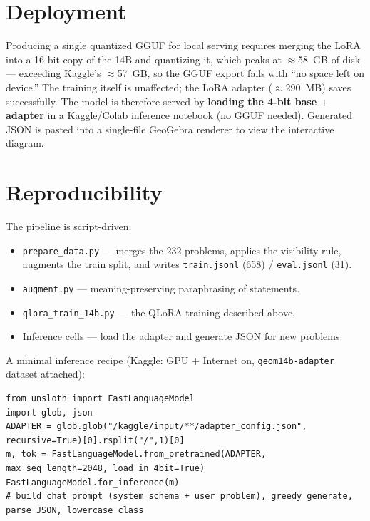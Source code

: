 \documentclass[11pt]{article}
\newcommand{\code}[1]{\texttt{#1}}
\begin{document}
\section{Deployment}
Producing a single quantized GGUF for local serving requires merging the LoRA into a 16-bit
copy of the 14B and quantizing it, which peaks at $\approx$58~GB of disk --- exceeding Kaggle's
$\approx$57~GB, so the GGUF export fails with ``no space left on device.'' The training itself
is unaffected; the LoRA adapter ($\approx$290~MB) saves successfully. The model is therefore
served by \textbf{loading the 4-bit base $+$ adapter} in a Kaggle/Colab inference notebook
(no GGUF needed). Generated JSON is pasted into a single-file GeoGebra renderer to view the
interactive diagram.

\section{Reproducibility}
The pipeline is script-driven:
\begin{itemize}[noitemsep]
  \item \code{prepare\_data.py} --- merges the 232 problems, applies the visibility rule, augments
        the train split, and writes \code{train.jsonl} (658) / \code{eval.jsonl} (31).
  \item \code{augment.py} --- meaning-preserving paraphrasing of statements.
  \item \code{qlora\_train\_14b.py} --- the QLoRA training described above.
  \item Inference cells --- load the adapter and generate JSON for new problems.
\end{itemize}

A minimal inference recipe (Kaggle: GPU + Internet on, \code{geom14b-adapter} dataset attached):
\begin{lstlisting}
from unsloth import FastLanguageModel
import glob, json
ADAPTER = glob.glob("/kaggle/input/**/adapter_config.json", recursive=True)[0].rsplit("/",1)[0]
m, tok = FastLanguageModel.from_pretrained(ADAPTER, max_seq_length=2048, load_in_4bit=True)
FastLanguageModel.for_inference(m)
# build chat prompt (system schema + user problem), greedy generate, parse JSON, lowercase class
\end{lstlisting}
\end{document}
